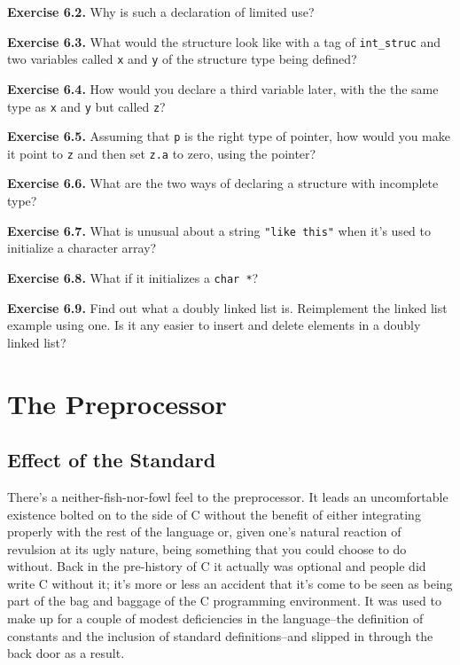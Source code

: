   \textbf{Exercise 6.2.} Why is such a declaration of limited use?


  \textbf{Exercise 6.3.} What would the structure look like with a tag of
   \texttt{int\_struc} and two variables called \texttt{x} and
   \texttt{y} of the structure type being defined?


  \textbf{Exercise 6.4.} How would you declare a third variable later, with the
   the same type as \texttt{x} and \texttt{y} but called
   \texttt{z}?


  \textbf{Exercise 6.5.} Assuming that \texttt{p} is the right type of
   pointer, how would you make it point to \texttt{z} and then set
   \texttt{z.a} to zero, using the pointer?


  \textbf{Exercise 6.6.} What are the two ways of declaring a structure with
   incomplete type?


  \textbf{Exercise 6.7.} What is unusual about a string \texttt{"like this"}
   when it's used to initialize a character array?


  \textbf{Exercise 6.8.} What if it initializes a
   \texttt{char *}?


  \textbf{Exercise 6.9.} Find out what a doubly linked list is. Reimplement the
   linked list example using one. Is it any easier to insert and delete
   elements in a doubly linked list?


   \chapter{The Preprocessor}


   \section{Effect of the Standard}


   There's a neither-fish-nor-fowl feel to the preprocessor. It leads an
   uncomfortable existence bolted on to the side of C without the benefit of
   either integrating properly with the rest of the language or, given one's
   natural reaction of revulsion at its ugly nature, being something that
   you could choose to do without. Back in the pre-history of C it actually
   was optional and people did write C without it; it's more or less an
   accident that it's come to be seen as being part of the bag and baggage
   of the C programming environment. It was used to make up for a couple of
   modest deficiencies in the language--the definition of constants and
   the inclusion of standard definitions--and slipped in through the
   back door as a result.


